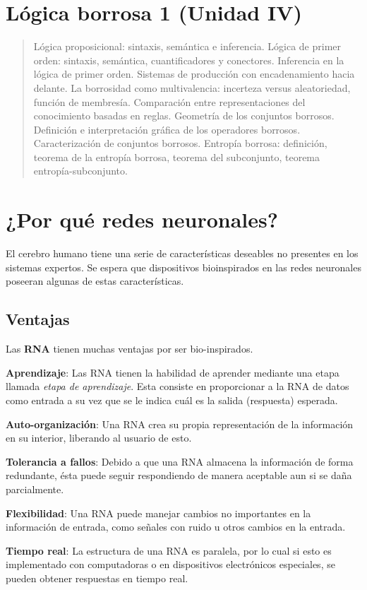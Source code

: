 \documentclass[10pt,a4paper]{article}
\begin{document}
\section*{Lógica borrosa 1 (Unidad IV)}
\begin{quote}
Lógica proposicional: sintaxis, semántica e inferencia. Lógica de primer orden: sintaxis, semántica, cuantificadores y conectores. Inferencia en la lógica de primer orden. Sistemas de producción con encadenamiento hacia delante. La borrosidad como multivalencia: incerteza versus aleatoriedad,  función de membresía. Comparación entre representaciones del conocimiento basadas en reglas. Geometría de los conjuntos borrosos. Definición e interpretación gráfica de los operadores borrosos. Caracterización de conjuntos borrosos. Entropía borrosa: definición, teorema de la entropía borrosa, teorema del subconjunto, teorema entropía-subconjunto.
\end{quote}

\pagebreak
\maketitle

\section{¿Por qué redes neuronales?}

El cerebro humano tiene una serie de características deseables no presentes en los sistemas expertos. Se espera que dispositivos bioinspirados en las redes neuronales poseeran algunas de estas características.

\subsection{Ventajas}
Las \textbf{RNA} tienen muchas ventajas por ser bio-inspirados.
\begin{description}
\item \textbf{Aprendizaje}: Las RNA tienen la habilidad de aprender mediante una etapa llamada \textit{etapa de aprendizaje}. Esta consiste en proporcionar a la RNA de datos como entrada a su vez que se le indica cuál es la salida (respuesta) esperada.
\item \textbf{Auto-organización}: Una RNA crea su propia representación de la información en su interior, liberando al usuario de esto.
\item \textbf{Tolerancia a fallos}: Debido a que una RNA almacena la información de forma redundante, ésta puede seguir respondiendo de manera aceptable aun si se daña parcialmente.
\item \textbf{Flexibilidad}: Una RNA puede manejar cambios no importantes en la información de entrada, como señales con ruido u otros cambios en la entrada.
\item \textbf{Tiempo real}: La estructura de una RNA es paralela, por lo cual si esto es implementado con computadoras o en dispositivos electrónicos especiales, se pueden obtener respuestas en tiempo real.
\end{description}
\end{document}

